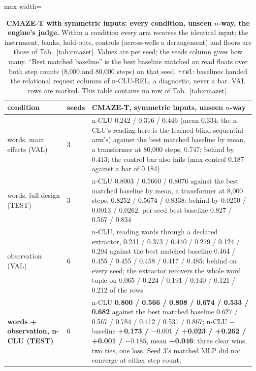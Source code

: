\documentclass{article} %
\begin{document}
\begin{table}[h]
\centering\scriptsize
\caption{\textbf{CMAZE-T with symmetric inputs: every condition, unseen $n$-way, the engine's judge.} Within a %
condition every arm receives the identical input; the instrument, banks, hold-outs, controls
(across-wells a derangement) and floors are those of Tab.~\ref{tab:cmazet}. Values are per seed; the
seeds column gives how many. ``Best matched baseline'' is the best baseline matched on read floats over both
step counts (8,000 and 80,000 steps) on that seed. %
\texttt{+rel}: baselines handed the relational request columns of
n-CLU-REL, a diagnostic, never a bar. VAL rows are marked. This table contains no row of
Tab.~\ref{tab:cmazet}.}
\label{tab:cmazet-sym}
\setlength{\tabcolsep}{2pt}
\begin{adjustbox}{max width=\linewidth}\begin{tabular}{p{2.2cm}p{0.6cm}p{10.3cm}}
\toprule
condition & seeds & CMAZE-T, symmetric inputs, unseen $n$-way \\
\midrule
words, main effects (VAL) & 3 & n-CLU 0.242 / 0.316 / 0.446 (mean 0.334; the n-CLU's reading here is the learned blind-sequential arm's) against the best matched baseline by mean, a transformer at 80,000 steps, 0.747; behind by 0.413; the control bar also fails (max control 0.187 against a bar of 0.184) \\
words, full design (TEST) & 3 & n-CLU 0.8003 / 0.5660 / 0.8076 against the best matched baseline by mean, a transformer at 8,000 steps, 0.8252 / 0.5674 / 0.8338: behind by 0.0250 / 0.0013 / 0.0262; per-seed best baseline 0.827 / 0.567 / 0.834 \\
observation (VAL) & 6 & n-CLU, reading words through a declared extractor, 0.241 / 0.373 / 0.440 / 0.279 / 0.124 / 0.204 against the best matched baseline 0.464 / 0.455 / 0.455 / 0.458 / 0.417 / 0.485: behind on every seed; the extractor recovers the whole word tuple on 0.065 / 0.224 / 0.191 / 0.140 / 0.121 / 0.212 of the rows \\
\midrule
\textbf{words + observation, n-CLU (TEST)} & 6 & n-CLU \textbf{0.800 / 0.566 / 0.808 / 0.674 / 0.533 / 0.682} against the best matched baseline 0.627 / 0.567 / 0.784 / 0.412 / 0.531 / 0.867; n-CLU $-$ baseline \textbf{+0.173 / $-0.001$ / +0.023 / +0.262 / +0.001 / $-0.185$}, mean \textbf{+0.046}: three clear wins, two ties, one loss. Seed 3's matched MLP did not converge at either step count;

\end{tabular}
\end{adjustbox}
\end{table}
\end{document}
